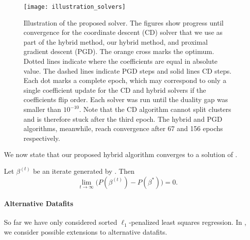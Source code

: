 \begin{figure*}[htb]
  \centering
  \texttt{[image: illustration\_solvers]}
  \caption{Illustration of the proposed solver. The figures show progress
    until convergence for the coordinate descent (CD) solver that we use as part
    of the hybrid method, our hybrid method, and  proximal gradient descent
    (PGD). The orange cross marks the optimum. Dotted lines indicate where the
    coefficients are equal in absolute value. The dashed lines indicate PGD
    steps and solid lines CD steps. Each dot marks a complete epoch, which may
    correspond to only a single coefficient update for the CD and hybrid
    solvers if the coefficients flip order. Each solver was run until the duality
    gap was smaller than \(10^{-10}\). Note that the CD algorithm cannot split clusters
    and is therefore stuck after the third epoch. The hybrid and PGD algorithms,
    meanwhile, reach convergence after 67 and 156 epochs respectively.}
  \label{fig:illustration-solver}
\end{figure*}

We now state that our proposed hybrid algorithm converges to a solution of .


\begin{lemma}
  \label{lem:convergence}
  Let \(\beta^{(t)}\) be an iterate generated by . Then
  \[
    \lim_{t \rightarrow \infty}\big(P(\beta^{(t)}) - P(\beta^*)\big) = 0.
  \]
\end{lemma}

\paragraph{Alternative Datafits}

So far we have only considered sorted \(\ell_1\)-penalized least squares regression.
In , we consider possible extensions to alternative datafits.

